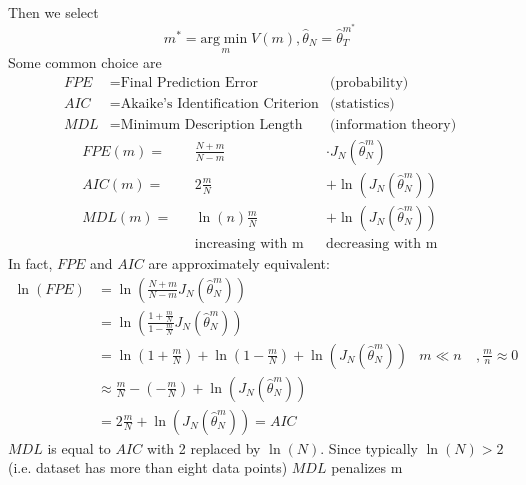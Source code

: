 Then we select
\begin{equation*}
m^{*} =\underset{m}{\mathrm{arg}\min} V(m) ,\hat{\theta }_{N} =\hat{\theta }_{T}^{m^{*}}
\end{equation*}
Some common choice are
\begin{align*}
FPE & =\text{Final Prediction Error} & \text{(probability)}\\
AIC & =\text{Akaike's Identification Criterion} & \text{(statistics)}\\
MDL & =\text{Minimum Description Length} & \text{(information theory)}
\end{align*}
\begin{equation*}
 \begin{aligned}
FPE(m) = & & \frac{N+m}{N-m}  & & \cdotp J_{N}\left(\hat{\theta }_{N}^{m}\right)\\
AIC(m) = & & 2\frac{m}{N}  & & +\ln\left(J_{N}\left(\hat{\theta }_{N}^{m}\right)\right)\\
MDL(m) = & & \ln(n)\frac{m}{N} & & +\ln\left(J_{N}\left(\hat{\theta }_{N}^{m}\right)\right)\\
 & & \text{increasing with m} & & \text{decreasing with m}
\end{aligned}
\end{equation*}
In fact, $ FPE$ and $ AIC$ are approximately equivalent:
\begin{equation*}
\begin{aligned}
\ln(FPE) & =\ln\left(\frac{N+m}{N-m} J_{N}\left(\hat{\theta }_{N}^{m}\right)\right) &  & \\
 & =\ln\left(\frac{1+\frac{m}{N}}{1-\frac{m}{N}} J_{N}\left(\hat{\theta }_{N}^{m}\right)\right) &  & \\
 & =\ln\left(1+\frac{m}{N}\right) +\ln\left(1-\frac{m}{N}\right) +\ln\left(J_{N}\left(\hat{\theta }_{N}^{m}\right)\right) & m\ll n & \ , \frac{m}{n} \approx 0\\
 & \approx \frac{m}{N} -\left(-\frac{m}{N}\right) +\ln\left(J_{N}\left(\hat{\theta }_{N}^{m}\right)\right) &  & \\
 & =2\frac{m}{N} +\ln\left(J_{N}\left(\hat{\theta }_{N}^{m}\right)\right) =AIC &  & 
\end{aligned}
\end{equation*}
$ MDL$ is equal to $ AIC$ with 2 replaced by $ \ln(N)$. Since typically $ \ln(N)  >2$ (i.e. dataset has more than eight data points) $ MDL$ penalizes m